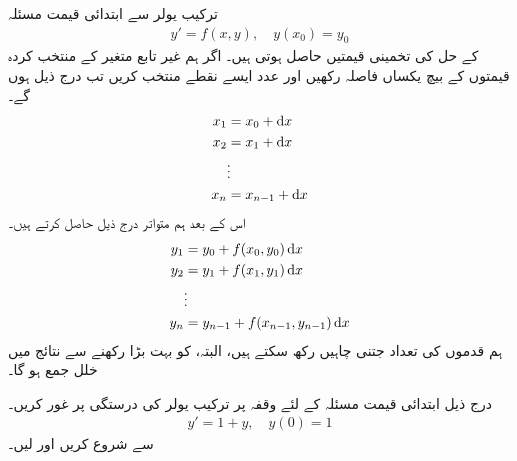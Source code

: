 ترکیب یولر سے ابتدائی قیمت مسئلہ
\begin{align*}
y'=f(x,y),\quad y(x_0)=y_0
\end{align*}
کے حل کی تخمینی قیمتیں حاصل ہوتی ہیں۔ اگر ہم غیر تابع متغیر کے منتخب کردہ قیمتوں کے بیچ یکساں فاصلہ رکھیں اور  عدد ایسے نقطے منتخب کریں تب درج ذیل ہوں گے۔
\begin{gather}
\begin{aligned}\label{مساوات_ماورائی_ترکیب_یولر_ایکس}
x_1&=x_0+\dif x\\
x_2&=x_1+\dif x\\
&\vdots\\
x_n&=x_{n-1}+\dif x
\end{aligned}
\end{gather}
اس کے بعد ہم متواتر درج ذیل حاصل کرتے ہیں۔
\begin{gather}
\begin{aligned}\label{مساوات_ماورائی_ترکیب_یولر_وائے}
y_1&=y_0+f(x_0,y_0)\dif x\\
y_2&=y_1+f(x_1,y_1)\dif x\\
&\vdots\\
y_n&=y_{n-1}+f(x_{n-1},y_{n-1})\dif x
\end{aligned}
\end{gather}
ہم قدموں کی تعداد  جتنی چاہیں رکھ سکتے ہیں، البتہ،  کو بہت بڑا رکھنے سے نتائج میں خلل جمع ہو گا۔

درج ذیل ابتدائی قیمت مسئلہ کے لئے وقفہ  پر  ترکیب یولر کی درستگی پر غور کریں۔
\begin{align*}
y'=1+y,\quad y(0)=1
\end{align*}
 سے شروع کریں اور  لیں۔


